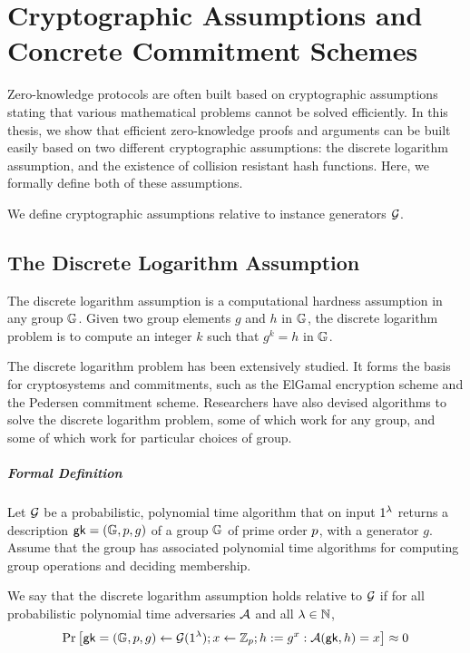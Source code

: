 \chapter{Cryptographic Assumptions and Concrete Commitment Schemes}
\label{chapterlabel:Cryptographic-Assumptions}

Zero-knowledge protocols are often built based on cryptographic assumptions stating that various mathematical problems cannot be solved efficiently. In this thesis, we show that efficient zero-knowledge proofs and arguments can be built easily based on two different cryptographic assumptions: the discrete logarithm assumption, and the existence of collision resistant hash functions. Here, we formally define both of these assumptions.

We define cryptographic assumptions relative to instance generators $\mathcal{G}$.

\section{The Discrete Logarithm Assumption}

The discrete logarithm assumption is a computational hardness assumption in any group $\mathbb{G}$. Given two group elements $g$ and $h$ in $\mathbb{G}$, the discrete logarithm problem is to compute an integer $k$ such that $g^k = h$ in $\mathbb{G}$.

The discrete logarithm problem has been extensively studied. It forms the basis for cryptosystems and commitments, such as the ElGamal encryption scheme and the Pedersen commitment scheme. Researchers have also devised algorithms to solve the discrete logarithm problem, some of which work for any group, and some of which work for particular choices of group.

\paragraph{Formal Definition}

Let $\mathcal{G}$ be a probabilistic, polynomial time algorithm that on input $1^{\lambda}$ returns a description $\mathsf{gk} = (\mathbb{G},p,g)$ of a group $\mathbb{G}$ of prime order $p$, with a generator $g$. Assume that the group has associated polynomial time algorithms for computing group operations and deciding membership.

We say that the discrete logarithm assumption holds relative to $\mathcal{G}$ if for all probabilistic polynomial time adversaries $\mathcal{A}$ and all $\lambda \in \mathbb{N}$,
$$ \Pr \left[ \mathsf{gk} = (\mathbb{G},p,g) \gets \mathcal{G}(1^{\lambda}); x \gets \mathbb{Z}_{p}; h := g^x : \mathcal{A}(\mathsf{gk},h)=x \right] \approx 0 $$

